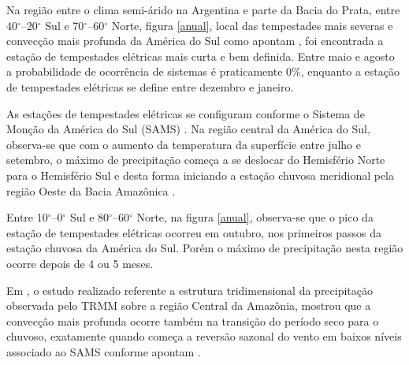  

Na região entre o clima semi-árido na Argentina e parte da Bacia do Prata, entre 40$^{\circ}$--20$^{\circ}$ Sul e 70$^{\circ}$--60$^{\circ}$ Norte, figura \ref{anual}, local das tempestades mais severas e convecção mais profunda da América do Sul como apontam , foi encontrada a estação de tempestades elétricas mais curta e bem definida. Entre maio e agosto a probabilidade de ocorrência de sistemas é praticamente 0\%, enquanto a estação de tempestades elétricas se define entre dezembro e janeiro.%

As estações de tempestades elétricas se configuram conforme o Sistema de Monção da América do Sul (SAMS)     \cite{Zhou1998,Marengo2012}. Na região central da América do Sul, observa-se que com o aumento da temperatura da superfície entre julho e setembro, o máximo de precipitação começa a se deslocar do Hemisfério Norte para o Hemisfério Sul e desta forma iniciando a estação chuvosa meridional pela região Oeste da Bacia Amazônica \cite{Marengo2012,grimm2003nino,reboita2010regimes}.

Entre 10$^{\circ}$--0$^{\circ}$ Sul e 80$^{\circ}$--60$^{\circ}$ Norte,  na figura \ref{anual}, observa-se que o pico da estação de tempestades elétricas ocorreu em outubro, nos primeiros passos da estação chuvosa da América do Sul. Porém o máximo de precipitação nesta região ocorre depois de 4 ou 5 meses. 

Em , o estudo realizado referente a estrutura tridimensional da precipitação observada pelo TRMM sobre a região Central da Amazônia, mostrou que a convecção mais profunda ocorre também na transição do período seco para o chuvoso, exatamente quando começa a reversão sazonal do vento em baixos níveis associado ao SAMS conforme apontam .

